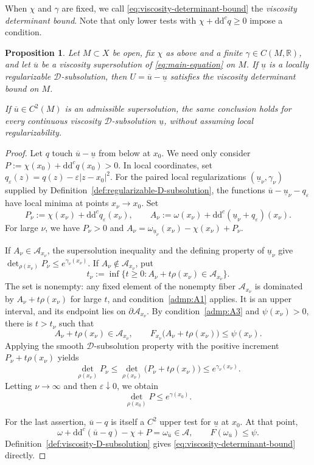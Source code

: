 \documentclass[oneside,english,letterpaper]{amsart}
\numberwithin{equation}{section}
\theoremstyle{plain}
\newtheorem{prop}[thm]{Proposition}
\theoremstyle{definition}
\theoremstyle{remark}
\renewcommand{\d}{\mathrm{d}}
\newcommand{\ddc}{\d\d^c}
\begin{document}
When $\chi$ and $\gamma$ are fixed, we call \eqref{eq:viscosity-determinant-bound} the
\emph{viscosity determinant bound}. Note that only lower tests with $\chi+\ddc q\geq0$
impose a condition.

\begin{prop}
	\label{prop:determinant-reduction}
	Let $M\subset X$ be open, fix $\chi$ as above and a finite $\gamma\in C(M,\mathbb R)$, and let
	$\overline u$ be a viscosity supersolution of
	\eqref{eq:main-equation} on $M$. If $\underline u$ is a locally
	regularizable $\mathcal D$-subsolution, then
	$U=\overline u-\underline u$ satisfies the viscosity determinant
	bound on $M$.
	
	If $\overline u\in C^2(M)$ is an admissible supersolution, the same
	conclusion holds for every continuous viscosity
	$\mathcal D$-subsolution $\underline u$, without assuming local
	regularizability.
\end{prop}

\begin{proof}
	Let $q$ touch $\overline u-\underline u$ from below at $x_0$.
	We need only consider $P:=\chi(x_0)+\ddc q(x_0)>0$. In local coordinates, set
	$q_\varepsilon(z)=q(z)-\varepsilon|z-x_0|^2$. For the paired local
	regularizations $(\underline u_\nu,\gamma_\nu)$ supplied by
	Definition~\ref{def:regularizable-D-subsolution}, the functions
	$\overline u-\underline u_\nu-q_\varepsilon$ have local minima at points
	$x_\nu\to x_0$. Set
	$$
	P_\nu:=\chi(x_\nu)+\ddc q_\varepsilon(x_\nu),
	\qquad
	A_\nu:=\omega(x_\nu)+\ddc(\underline u_\nu+q_\varepsilon)(x_\nu).
	$$
	For large $\nu$, we have $P_\nu>0$ and
	$A_\nu=\omega_{\underline u_\nu}(x_\nu)-\chi(x_\nu)+P_\nu$.
	
	If $A_\nu\in\mathcal A_{x_\nu}$, the supersolution inequality and
	the defining property of $\underline u_\nu$ give
	$\det_{\rho(x_\nu)}P_\nu\leq e^{\gamma_\nu(x_\nu)}$.
	If $A_\nu\notin\mathcal A_{x_\nu}$, put
	$$
	t_\nu:=\inf\{t\geq0:A_\nu+t\rho(x_\nu)\in\mathcal A_{x_\nu}\}.
	$$
	The set is nonempty: any fixed element of the nonempty fiber
	$\mathcal A_{x_\nu}$ is dominated by $A_\nu+t\rho(x_\nu)$ for
	large $t$, and condition~\ref{admp:A1} applies. It is an upper
	interval, and its endpoint lies on $\partial\mathcal A_{x_\nu}$.
	By condition~\ref{admp:A3} and $\psi(x_\nu)>0$, there is
	$t>t_\nu$ such that
	$$
	A_\nu+t\rho(x_\nu)\in\mathcal A_{x_\nu},
	\qquad
	F_{x_\nu}\bigl(A_\nu+t\rho(x_\nu)\bigr)\leq\psi(x_\nu).
	$$
	Applying the smooth $\mathcal D$-subsolution property with the
	positive increment $P_\nu+t\rho(x_\nu)$ yields
	$$
	\det_{\rho(x_\nu)}P_\nu
	\leq\det_{\rho(x_\nu)}\bigl(P_\nu+t\rho(x_\nu)\bigr)
	\leq e^{\gamma_\nu(x_\nu)}.
	$$
	Letting $\nu\to\infty$ and then $\varepsilon\downarrow0$, we obtain
	$$
	\det_{\rho(x_0)}P\leq e^{\gamma(x_0)}.
	$$
	
	For the last assertion, $\overline u-q$ is itself a $C^2$ upper
	test for $\underline u$ at $x_0$. At that point,
	$$
	\omega+\ddc(\overline u-q)-\chi+P
	=\omega_{\overline u}\in\mathcal A,
	\qquad F(\omega_{\overline u})\leq\psi.
	$$
	Definition~\ref{def:viscosity-D-subsolution} gives
	\eqref{eq:viscosity-determinant-bound} directly.
\end{proof}
\end{document}
